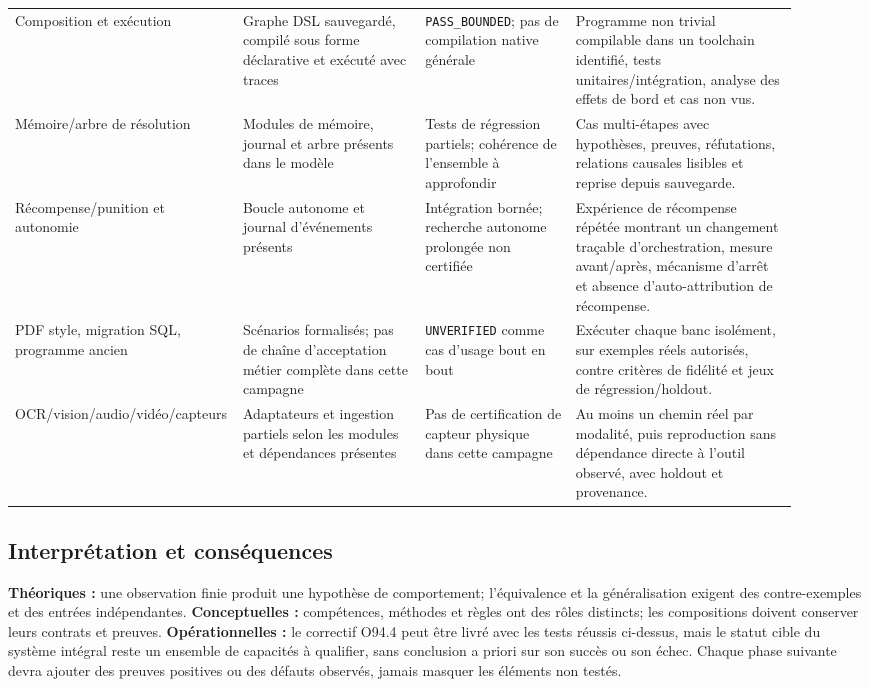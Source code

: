 \begin{longtable}{p{0.20\linewidth}p{0.23\linewidth}p{0.19\linewidth}p{0.29\linewidth}}
Composition et exécution & Graphe DSL sauvegardé, compilé sous forme déclarative et exécuté avec traces & \texttt{PASS\_BOUNDED}; pas de compilation native générale & Programme non trivial compilable dans un toolchain identifié, tests unitaires/intégration, analyse des effets de bord et cas non vus.\\
Mémoire/arbre de résolution & Modules de mémoire, journal et arbre présents dans le modèle & Tests de régression partiels; cohérence de l'ensemble à approfondir & Cas multi-étapes avec hypothèses, preuves, réfutations, relations causales lisibles et reprise depuis sauvegarde.\\
Récompense/punition et autonomie & Boucle autonome et journal d'événements présents & Intégration bornée; recherche autonome prolongée non certifiée & Expérience de récompense répétée montrant un changement traçable d'orchestration, mesure avant/après, mécanisme d'arrêt et absence d'auto-attribution de récompense.\\
PDF style, migration SQL, programme ancien & Scénarios formalisés; pas de chaîne d'acceptation métier complète dans cette campagne & \texttt{UNVERIFIED} comme cas d'usage bout en bout & Exécuter chaque banc isolément, sur exemples réels autorisés, contre critères de fidélité et jeux de régression/holdout.\\
OCR/vision/audio/vidéo/capteurs & Adaptateurs et ingestion partiels selon les modules et dépendances présentes & Pas de certification de capteur physique dans cette campagne & Au moins un chemin réel par modalité, puis reproduction sans dépendance directe à l'outil observé, avec holdout et provenance.\\
\bottomrule
\end{longtable}

\subsection{Interprétation et conséquences}
\textbf{Théoriques :} une observation finie produit une hypothèse de comportement; l'équivalence et la généralisation exigent des contre-exemples et des entrées indépendantes. \textbf{Conceptuelles :} compétences, méthodes et règles ont des rôles distincts; les compositions doivent conserver leurs contrats et preuves. \textbf{Opérationnelles :} le correctif O94.4 peut être livré avec les tests réussis ci-dessus, mais le statut cible du système intégral reste un ensemble de capacités à qualifier, sans conclusion a priori sur son succès ou son échec. Chaque phase suivante devra ajouter des preuves positives ou des défauts observés, jamais masquer les éléments non testés.
